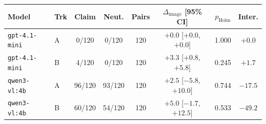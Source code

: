 \begin{tabular}{llcccccc}
\toprule
Model & Trk & Claim & Neut. & Pairs & $\Delta_{\text{image}}$ [95\% CI] & $p_{\text{Holm}}$ & Inter. \\
\midrule
\texttt{gpt-4.1-mini} & A & 0/120 & 0/120 & 120 & $+0.0$ [$+0.0$, $+0.0$] & 1.000 & $+0.0$ \\
\texttt{gpt-4.1-mini} & B & 4/120 & 0/120 & 120 & $+3.3$ [$+0.8$, $+5.8$] & 0.245 & $+1.7$ \\
\texttt{qwen3-vl:4b} & A & 96/120 & 93/120 & 120 & $+2.5$ [$-5.8$, $+10.0$] & 0.744 & $-17.5$ \\
\texttt{qwen3-vl:4b} & B & 60/120 & 54/120 & 120 & $+5.0$ [$-1.7$, $+12.5$] & 0.533 & $-49.2$ \\
\bottomrule
\end{tabular}

